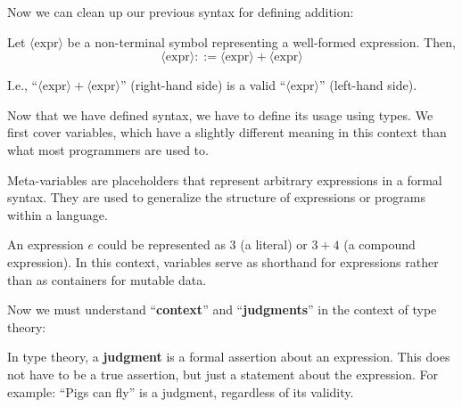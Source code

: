 \noindent
Now we can clean up our previous syntax for defining addition:

\begin{Example}

    \label{ex:production_rule_addition}
    Let $\langle \text{expr} \rangle$ be a non-terminal symbol representing a well-formed expression. Then,
    \vspace{-.5em}
    \[\langle \text{expr} \rangle ::= \langle \text{expr} \rangle + \langle \text{expr} \rangle\]

    \vspace{-.5em}
    \noindent
    I.e., ``$\langle \text{expr} \rangle + \langle \text{expr} \rangle$'' (right-hand side) 
    is a valid ``$\langle \text{expr} \rangle$'' (left-hand side).
\end{Example}


\newpage

\noindent
Now that we have defined syntax, we have to define its usage using types. We first cover variables, which have 
a slightly different meaning in this context than what most programmers are used to.
\begin{Def}

    Meta-variables are placeholders that represent arbitrary expressions in a formal syntax.
    They are used to generalize the structure of expressions or programs within a language.
\end{Def}

\vspace{-1em}
\begin{Example}

    An expression $e$ could be represented as $3$ (a literal) or $3 + 4$ (a compound expression).
    In this context, variables serve as shorthand for expressions rather than as containers for mutable data.
\end{Example}

\noindent
Now we must understand ``\textbf{context}'' and ``\textbf{judgments}'' in the context of type theory:

\begin{Def}[Judgments]

    In type theory, a \textbf{judgment} is a formal assertion about an expression. This does not 
    have to be a true assertion, but just a statement about the expression. For example: ``Pigs can fly''
    is a judgment, regardless of its validity.
\end{Def}

